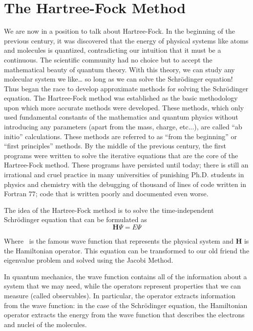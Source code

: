 \documentclass{tmr}
\begin{document}
\section{The Hartree-Fock Method}

We are now in a position to talk about Hartree-Fock. In the beginning of the previous century, it was discovered
that the energy of physical systems like atoms and molecules is quantized, contradicting our intuition
that it must be a continuous. The scientific community had no choice but to accept
the mathematical beauty of quantum theory.
With this theory, we can study any molecular system we like\ldots
so long as we can solve the Schr\"{o}dinger equation!
Thus began the race to develop approximate methods for solving the Schr\"{o}dinger equation.
The Hartree-Fock method was established as the basic methodology upon which more accurate methods were developed.
These methods, which only used fundamental constants of the mathematics and quantum physics without introducing
any parameters (apart from the mass, charge, etc...), are called ``ab initio'' calculations.
These methods are referred to as ``from the beginning'' or ``first principles'' methods.
By the middle of the previous century, the first programs were written to solve the
iterative equations that are the core of the Hartree-Fock method. These programs have persisted
until today; there is still an irrational and cruel practice in many universities of punishing Ph.D. students
in physics and chemistry with the debugging of thousand of lines of code written in Fortran 77;
code that is written poorly and documented even worse.

\par The idea of the Hartree-Fock method is to solve the time-independent Schr\"{o}dinger
 equation that can be formulated as
\[ \mathbf{H}\Psi = E\Psi \]

Where \textPsi\ is the famous wave function that represents the physical
system and \textbf{H} is the Hamiltonian operator. This equation can be
transformed to our old friend the eigenvalue problem and solved using the Jacobi Method.

\par In quantum mechanics, the wave function contains all of the information about a system that
we may need, while the operators represent properties that we can measure (called observables).
In particular, the operator extracts information from the wave function: in the case of the Schr\"odinger
equation, the Hamiltonian operator extracts the energy from the wave function that describes
the electrons and nuclei of the molecules.
\end{document}
